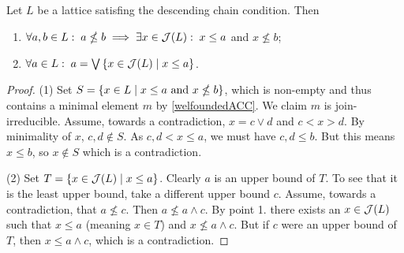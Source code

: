 \begin{proposition} \label{joinIrreducibilityDescendingChainLattice}
Let $L$ be a lattice satisfing the descending chain condition. Then
\begin{enumerate}
\item $\forall a,b\in L:\; a\nleq b \implies \exists x\in \operatorname{\mathcal{J}}(L): \; x\leq a$ and $x\nleq b$;
\item $\forall a\in L:\; a = \bigvee\setbuilder{x\in\joinIr(L)}{x\leq a}$.
\end{enumerate}
\end{proposition}
\begin{proof}
(1) Set $S = \setbuilder{x\in L}{\text{$x\leq a$ and $x\nleq b$}}$, which is non-empty and thus contains a minimal element $m$ by \ref{welfoundedACC}. We claim $m$ is join-irreducible. Assume, towards a contradiction, $x = c\vee d$ and $c < x > d$. By minimality of $x$, $c,d\notin S$. As $c,d< x \leq a$, we must have $c,d\leq b$. But this means $x\leq b$, so $x\notin S$ which is a contradiction.

(2) Set $T = \setbuilder{x\in\joinIr(L)}{x\leq a}$. Clearly $a$ is an upper bound of $T$. To see that it is the least upper bound, take a different upper bound $c$. Assume, towards a contradiction, that $a\nleq c$. Then $a\nleq a\wedge c$. By point 1. there exists an $x\in\operatorname{\mathcal{J}}(L)$ such that $x\leq a$ (meaning $x\in T$) and $x\nleq a\wedge c$. But if $c$ were an upper bound of $T$, then $x\leq a\wedge c$, which is a contradiction.
\end{proof}

